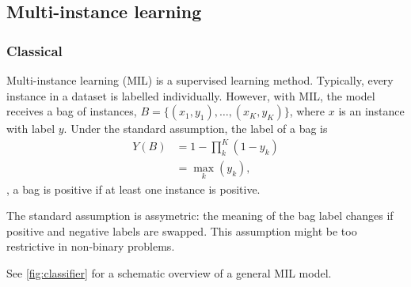 \subsection{Multi-instance learning}

\subsubsection{Classical}
Multi-instance learning (MIL) is a supervised learning method.
Typically, every instance in a dataset is labelled individually.
However, with MIL, the model receives a bag of instances, $B=\{(x_1,y_1),\ldots,(x_K,y_K)\}$, where $x$ is an instance with label $y$.
Under the standard assumption, the label of a bag is
\begin{align}
    Y(B) &= 1 - \prod_{k}^{K}(1-y_k) \\
         &= \max_k(y_k),
\end{align}
\ie, a bag is positive if at least one instance is positive.

The standard assumption is assymetric: the meaning of the bag label changes if positive and negative labels are swapped.
This assumption might be too restrictive in non-binary problems.

See \cref{fig:classifier} for a schematic overview of a general MIL model.

\begin{figure*}
    \centering
    
    \caption[Multi-instance learning classification]{
        Extracted features (tile features in this work) are presented to a multi-layer perceptron (MLP) with learnable weights.
        The first MLP outputs an aggregate that summarizes all input features.
        The aggregate is used as input to a classifier MLP with learnable weights that outputs a prediction.
        Weights are updated based on pre-defined loss between prediction and target.
    }
    \label{fig:classifier}
\end{figure*}


